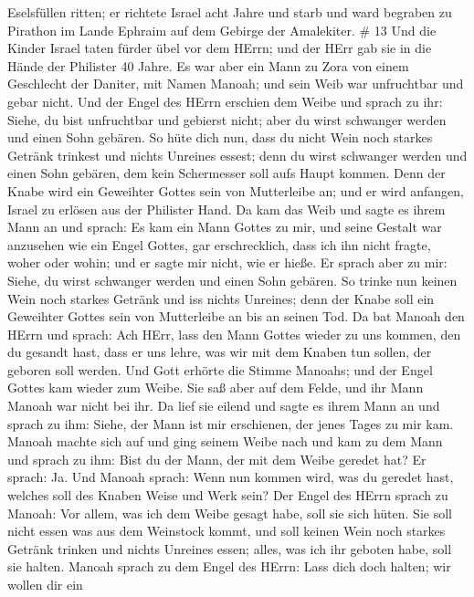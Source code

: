 Eselsfüllen ritten; er richtete Israel acht Jahre  und
starb und ward begraben zu Pirathon im Lande Ephraim auf dem Gebirge der
Amalekiter. \# 13  Und die Kinder Israel taten fürder übel
vor dem HErrn; und der HErr gab sie in die Hände der Philister 40 Jahre.
 Es war aber ein Mann zu Zora von einem Geschlecht der
Daniter, mit Namen Manoah; und sein Weib war unfruchtbar und gebar
nicht.  Und der Engel des HErrn erschien dem Weibe und
sprach zu ihr: Siehe, du bist unfruchtbar und gebierst nicht; aber du
wirst schwanger werden und einen Sohn gebären.  So hüte dich
nun, dass du nicht Wein noch starkes Getränk trinkest und nichts
Unreines essest;  denn du wirst schwanger werden und einen
Sohn gebären, dem kein Schermesser soll aufs Haupt kommen. Denn der
Knabe wird ein Geweihter Gottes sein von Mutterleibe an; und er wird
anfangen, Israel zu erlösen aus der Philister Hand.  Da kam
das Weib und sagte es ihrem Mann an und sprach: Es kam ein Mann Gottes
zu mir, und seine Gestalt war anzusehen wie ein Engel Gottes, gar
erschrecklich, dass ich ihn nicht fragte, woher oder wohin; und er sagte
mir nicht, wie er hieße.  Er sprach aber zu mir: Siehe, du
wirst schwanger werden und einen Sohn gebären. So trinke nun keinen Wein
noch starkes Getränk und iss nichts Unreines; denn der Knabe soll ein
Geweihter Gottes sein von Mutterleibe an bis an seinen Tod. 
Da bat Manoah den HErrn und sprach: Ach HErr, lass den Mann Gottes
wieder zu uns kommen, den du gesandt hast, dass er uns lehre, was wir
mit dem Knaben tun sollen, der geboren soll werden.  Und
Gott erhörte die Stimme Manoahs; und der Engel Gottes kam wieder zum
Weibe. Sie saß aber auf dem Felde, und ihr Mann Manoah war nicht bei
ihr.  Da lief sie eilend und sagte es ihrem Mann an und
sprach zu ihm: Siehe, der Mann ist mir erschienen, der jenes Tages zu
mir kam.  Manoah machte sich auf und ging seinem Weibe nach
und kam zu dem Mann und sprach zu ihm: Bist du der Mann, der mit dem
Weibe geredet hat? Er sprach: Ja.  Und Manoah sprach: Wenn
nun kommen wird, was du geredet hast, welches soll des Knaben Weise und
Werk sein?  Der Engel des HErrn sprach zu Manoah: Vor
allem, was ich dem Weibe gesagt habe, soll sie sich hüten. 
Sie soll nicht essen was aus dem Weinstock kommt, und soll keinen Wein
noch starkes Getränk trinken und nichts Unreines essen; alles, was ich
ihr geboten habe, soll sie halten.  Manoah sprach zu dem
Engel des HErrn: Lass dich doch halten; wir wollen dir ein

